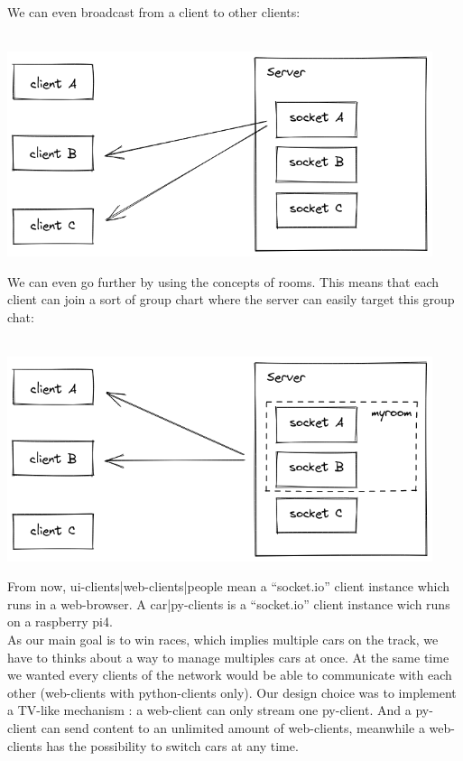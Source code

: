 \documentclass[12pt]{article}
\begin{document}
We can even broadcast from a client to other clients: \\ \\
\centerline{\includegraphics[height=6cm]{../../docs/broadcast-1.png}}

We can even go further by using the concepts of rooms. This means that each client can join a sort of group chart where the server can easily target this group chat: \\ \\
\centerline{\includegraphics[height=6cm]{../../docs/rooms.png}}

From now, ui-clients|web-clients|people mean a “socket.io” client instance which runs in a web-browser. A car|py-clients is a “socket.io” client instance wich runs on a raspberry pi4. \\

As our main goal is to win races, which implies multiple cars on the track, we have to thinks about a way to manage multiples cars at once. At the same time we wanted every clients of the network would be able to communicate with each other (web-clients with python-clients only). Our design choice was to implement a TV-like mechanism : a web-client can only stream one py-client. And a py-client can send content to an unlimited amount of web-clients, meanwhile a web-clients has the possibility to switch cars at any time. \\
\end{document}
